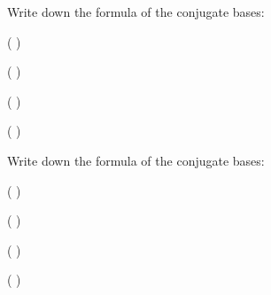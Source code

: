 \documentclass[main.tex]{subfiles}
\begin{document}
\begin{multicols*}{2}
\begin{question}[ID=\the\value{numA}]
Write down the formula of the conjugate bases:
\begin{inparaenum}[(a)]
\item  {} %
\item  {} %
\item  {} %
\item  {} %
 \end{inparaenum}
\end{question}
\begin{solution}
\begin{inparaenum}[(a)]
\item  {}  ( )
\item  {}  ( )
\item  {}  ( )
\item  {}  ( ) 
 \end{inparaenum}
\hspace{0.1cm}\end{solution}%

\begin{question}[ID=\the\value{numA}]
Write down the formula of the conjugate bases:
\begin{inparaenum}[(a)]
\item  {} %
\item  {} %
\item  {} %
\item  {} %
 \end{inparaenum}
\end{question}
\begin{solution}
\begin{inparaenum}[(a)]
\item  {}  ( )
\item  {}  ( )
\item  {}  ( )
\item  {}  ( ) 
 \end{inparaenum}
\hspace{0.1cm}\end{solution}%



\end{multicols*}
\end{document}
